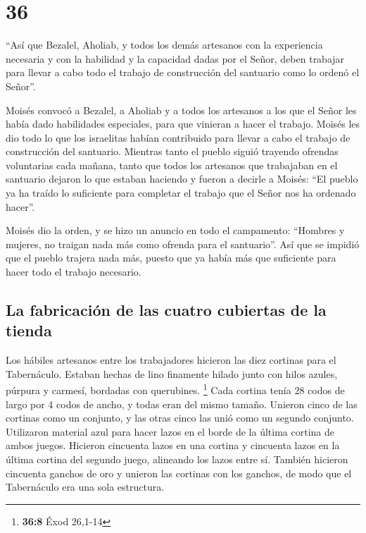 \hypertarget{section-35}{%
\section{36}\label{section-35}}

 ``Así que Bezalel, Aholiab, y todos los demás artesanos
con la experiencia necesaria y con la habilidad y la capacidad dadas por
el Señor, deben trabajar para llevar a cabo todo el trabajo de
construcción del santuario como lo ordenó el Señor''.

 Moisés convocó a Bezalel, a Aholiab y a todos los
artesanos a los que el Señor les había dado habilidades especiales, para
que vinieran a hacer el trabajo.  Moisés les dio todo lo
que los israelitas habían contribuido para llevar a cabo el trabajo de
construcción del santuario. Mientras tanto el pueblo siguió trayendo
ofrendas voluntarias cada mañana,  tanto que todos los
artesanos que trabajaban en el santuario dejaron lo que estaban haciendo
 y fueron a decirle a Moisés: ``El pueblo ya ha traído lo
suficiente para completar el trabajo que el Señor nos ha ordenado
hacer''.

 Moisés dio la orden, y se hizo un anuncio en todo el
campamento: ``Hombres y mujeres, no traigan nada más como ofrenda para
el santuario''. Así que se impidió que el pueblo trajera nada más,
 puesto que ya había más que suficiente para hacer todo el
trabajo necesario.

\hypertarget{la-fabricaciuxf3n-de-las-cuatro-cubiertas-de-la-tienda}{%
\subsection{La fabricación de las cuatro cubiertas de la
tienda}\label{la-fabricaciuxf3n-de-las-cuatro-cubiertas-de-la-tienda}}

 Los hábiles artesanos entre los trabajadores hicieron las
diez cortinas para el Tabernáculo. Estaban hechas de lino finamente
hilado junto con hilos azules, púrpura y carmesí, bordadas con
querubines. \footnote{\textbf{36:8} Éxod 26,1-14}  Cada
cortina tenía 28 codos de largo por 4 codos de ancho, y todas eran del
mismo tamaño.  Unieron cinco de las cortinas como un
conjunto, y las otras cinco las unió como un segundo conjunto.
 Utilizaron material azul para hacer lazos en el borde de
la última cortina de ambos juegos.  Hicieron cincuenta
lazos en una cortina y cincuenta lazos en la última cortina del segundo
juego, alineando los lazos entre sí.  También hicieron
cincuenta ganchos de oro y unieron las cortinas con los ganchos, de modo
que el Tabernáculo era una sola estructura.

